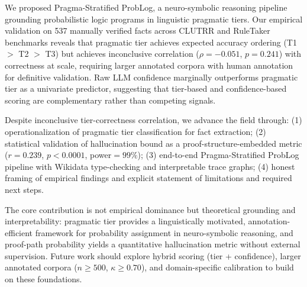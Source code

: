 \documentclass[11pt,letterpaper]{article}
\begin{document}
We proposed Pragma-Stratified ProbLog, a neuro-symbolic reasoning pipeline grounding probabilistic logic programs in linguistic pragmatic tiers. Our empirical validation on 537 manually verified facts across CLUTRR and RuleTaker benchmarks reveals that pragmatic tier achieves expected accuracy ordering (T1 $>$ T2 $>$ T3) but achieves inconclusive correlation ($\rho=-0.051$, $p=0.241$) with correctness at scale, requiring larger annotated corpora with human annotation for definitive validation. Raw LLM confidence marginally outperforms pragmatic tier as a univariate predictor, suggesting that tier-based and confidence-based scoring are complementary rather than competing signals.

Despite inconclusive tier-correctness correlation, we advance the field through: (1) operationalization of pragmatic tier classification for fact extraction; (2) statistical validation of hallucination bound as a proof-structure-embedded metric ($r=0.239$, $p<0.0001$, power$=99\%$); (3) end-to-end Pragma-Stratified ProbLog pipeline with Wikidata type-checking and interpretable trace graphs; (4) honest framing of empirical findings and explicit statement of limitations and required next steps.

The core contribution is not empirical dominance but theoretical grounding and interpretability: pragmatic tier provides a linguistically motivated, annotation-efficient framework for probability assignment in neuro-symbolic reasoning, and proof-path probability yields a quantitative hallucination metric without external supervision. Future work should explore hybrid scoring (tier + confidence), larger annotated corpora ($n\geq500$, $\kappa\geq0.70$), and domain-specific calibration to build on these foundations.



\end{document}
